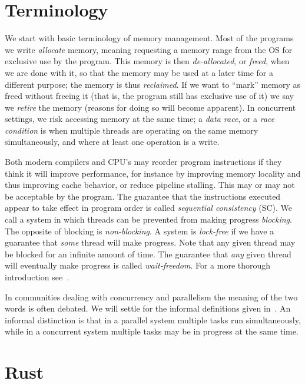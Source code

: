 \documentclass[b5paper]{report}
\begin{document}
\section{Terminology} We start with basic terminology of memory management. Most
of the programs we write \emph{allocate} memory, meaning requesting a memory
range from the OS for exclusive use by the program. This memory is then
\emph{de-allocated}, or \emph{freed}, when we are done with it, so that the
memory may be used at a later time for a different purpose; the memory is thus
\emph{reclaimed}. If we want to ``mark'' memory as freed without freeing it
(that is, the program still has exclusive use of it) we say we \emph{retire} the
memory (reasons for doing so will become apparent). In concurrent settings, we
risk accessing memory at the same time; a \emph{data race}, or a \emph{race
condition} is when multiple threads are operating on the same memory
simultaneously, and where at least one operation is a write.

Both modern compilers and CPU's may reorder program instructions if they think it
will improve performance, for instance by improving memory locality and thus
improving cache behavior, or reduce pipeline stalling. This may or may not be
acceptable by the program. The guarantee that the instructions executed appear
to take effect in program order is called \emph{sequential consistency} (SC).
We call a system in which threads can be prevented from making progress
\emph{blocking}. The opposite of blocking is \emph{non-blocking}. A system is
\emph{lock-free} if we have a guarantee that \emph{some} thread will make
progress. Note that any given thread may be blocked for an infinite amount of
time. The guarantee that \emph{any} given thread will eventually make progress
is called \emph{wait-freedom}.  For a more thorough introduction
see~\cite{herlihy2011art}.

In communities dealing with concurrency and parallelism the meaning of the two
words is often debated. We will settle for the informal definitions given
in~\cite{pacheco2011introduction}. An informal distinction is that in a parallel
system multiple tasks run simultaneously, while in a concurrent system multiple
tasks may be in progress at the same time.


\section{Rust}\label{sec:rust}
\end{document}
